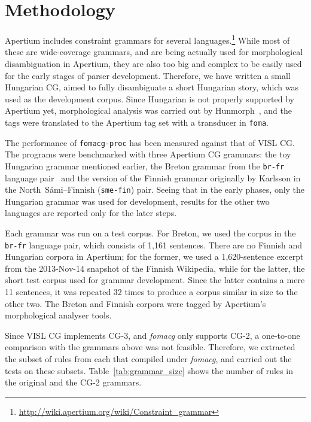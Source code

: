 \documentclass[11pt]{article}
\begin{document}

\section{Methodology}
\label{sec:methodology}

Apertium includes constraint grammars for several
languages.\footnote{\url{http://wiki.apertium.org/wiki/Constraint_grammar}} While
most of these are wide-coverage grammars, and are being actually used for morphological
disambiguation in Apertium, they are also too big and complex to be easily used
for the early stages of parser development. Therefore, we have written a small
Hungarian CG, aimed to fully disambiguate a short Hungarian story, which was used
as the development corpus. Since Hungarian is not properly supported by Apertium
yet, morphological analysis was carried out by Hunmorph~\cite{Tron:2005}, and
the tags were translated to the Apertium tag set with a transducer in \texttt{foma}.

The performance of \texttt{fomacg-proc} has been measured against that of
VISL CG. The programs were benchmarked with three Apertium CG grammars: the toy
Hungarian grammar mentioned earlier, the Breton grammar from the \texttt{br-fr}
language pair~\cite{Tyers:2010} and the version of the Finnish grammar originally
by Karlsson in the North~Sámi--Finnish (\texttt{sme-fin}) pair. %
Seeing that in the early phases, only the Hungarian grammar was used for
development, results for the other two languages are reported only for the later
steps.

Each grammar was run on a test corpus. For Breton, we used the corpus
in the \texttt{br-fr} language pair, which consists of 1,161 sentences. There
are no Finnish and Hungarian corpora in Apertium; for the former, we used a
1,620-sentence excerpt from the 2013-Nov-14 snapshot of the Finnish Wikipedia,
while for the latter, the short test corpus used for grammar development. Since
the latter contains a mere 11 sentences, it was repeated 32 times to produce
a corpus similar in size to the other two. The Breton and Finnish corpora
were tagged by Apertium's morphological analyser tools.

Since VISL CG implements CG-3, and \emph{fomacg} only supports CG-2, a one-to-one
comparison with the grammars above was not feasible. Therefore, we extracted the
subset of rules from each that compiled under \emph{fomacg}, and carried out the tests
on these subsets. Table~\ref{tab:grammar_size} shows the number of rules in the
original and the CG-2 grammars.
\end{document}
